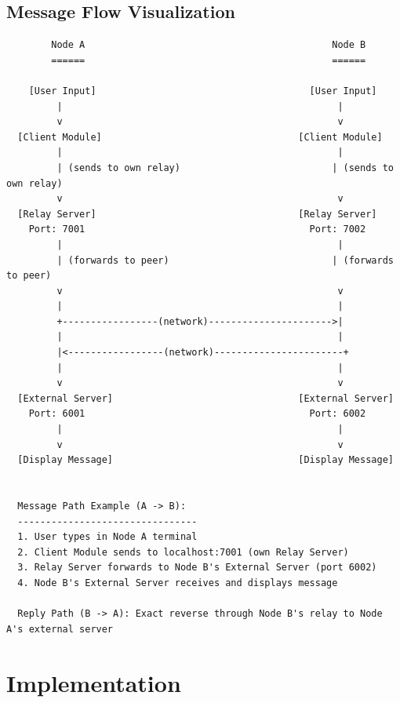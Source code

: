 \documentclass[11pt]{article}
\begin{document}
\subsection{Message Flow Visualization}

\begin{verbatim}
        Node A                                            Node B
        ======                                            ======

    [User Input]                                      [User Input]
         |                                                 |
         v                                                 v
  [Client Module]                                   [Client Module]
         |                                                 |
         | (sends to own relay)                           | (sends to own relay)
         v                                                 v
  [Relay Server]                                    [Relay Server]
    Port: 7001                                        Port: 7002
         |                                                 |
         | (forwards to peer)                             | (forwards to peer)
         v                                                 v
         |                                                 |
         +-----------------(network)---------------------->|
         |                                                 |
         |<-----------------(network)-----------------------+
         |                                                 |
         v                                                 v
  [External Server]                                 [External Server]
    Port: 6001                                        Port: 6002
         |                                                 |
         v                                                 v
  [Display Message]                                 [Display Message]


  Message Path Example (A -> B):
  --------------------------------
  1. User types in Node A terminal
  2. Client Module sends to localhost:7001 (own Relay Server)
  3. Relay Server forwards to Node B's External Server (port 6002)
  4. Node B's External Server receives and displays message

  Reply Path (B -> A): Exact reverse through Node B's relay to Node A's external server
\end{verbatim}

\newpage

\section{Implementation}
\end{document}

